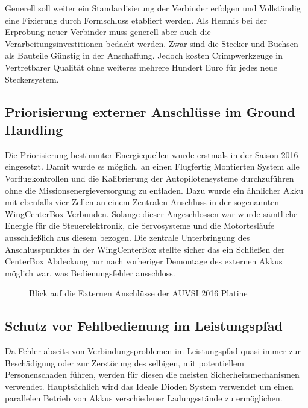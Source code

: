 Generell soll weiter ein Standardisierung der Verbinder erfolgen und Vollständig eine Fixierung durch Formschluss etabliert werden.
Als Hemnis bei der Erprobung neuer Verbinder muss generell aber auch die Verarbeitungsinvestitionen bedacht werden. Zwar sind die Stecker und Buchsen als Bauteile Günstig in der Anschaffung. Jedoch kosten Crimpwerkzeuge in Vertretbarer Qualität ohne weiteres mehrere Hundert Euro für jedes neue Steckersystem.





\subsection{Priorisierung externer Anschlüsse im Ground Handling}

Die Priorisierung bestimmter Energiequellen wurde erstmals in der Saison 2016 eingesetzt.
Damit wurde es möglich, an einen Flugfertig Montierten System alle Vorflugkontrollen und die Kalibrierung der Autopilotensysteme durchzuführen ohne die Missionsenergieversorgung zu entladen. Dazu wurde ein ähnlicher Akku mit ebenfalls vier Zellen an einem Zentralen Anschluss in der sogenannten WingCenterBox Verbunden. Solange dieser Angeschlossen war wurde sämtliche Energie für die Steuerelektronik, die Servosysteme und die Motortesläufe ausschließlich aus diesem bezogen. Die zentrale Unterbringung des Anschlusspunktes in der WingCenterBox stellte sicher das ein Schließen der CenterBox Abdeckung nur nach vorheriger Demontage des externen Akkus möglich war, was Bedienungsfehler ausschloss.

\begin{figure}[H]
\centering
{}
\caption{Blick auf die Externen Anschlüsse der AUVSI 2016 Platine} 
\label{fig:Blick auf die Externen Anschlüsse der AUVSI 2016 Platine}
\end{figure}


\subsection{Schutz vor Fehlbedienung im Leistungspfad}

Da Fehler abseits von Verbindungsproblemen im Leistungspfad quasi immer zur Beschädigung oder zur Zerstörung des selbigen, mit potentiellem Personenschaden führen, werden für diesen die meisten Sicherheitsmechanismen verwendet.
Hauptsächlich wird das Ideale Dioden System verwendet um einen parallelen Betrieb von Akkus verschiedener Ladungsstände zu ermöglichen.

